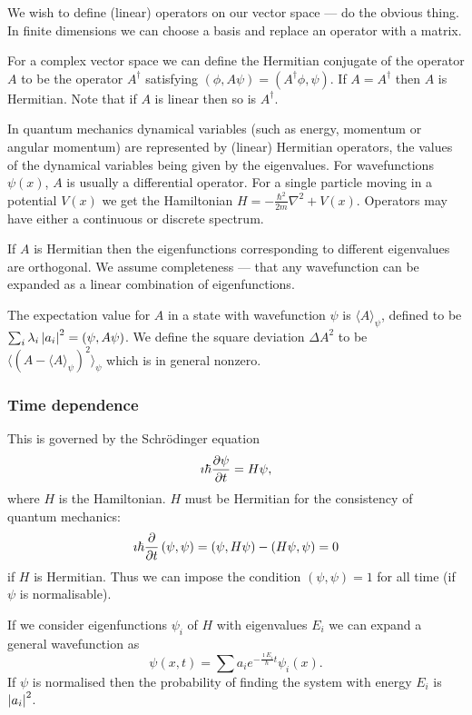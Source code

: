 \documentclass{notes}
\begin{document}
We wish to define (linear) operators on our vector space --- do the obvious
thing.  In finite dimensions we can choose a basis and replace an operator
with a matrix.

For a complex vector space we can define the Hermitian conjugate of the
operator $A$ to be the operator $A^\dag$ satisfying $(\phi, A \psi)
= (A^\dag \phi, \psi)$.  If $A = A^\dag$ then $A$ is Hermitian.  Note
that if $A$ is linear then so is $A^\dag$.

In quantum mechanics dynamical variables (such as energy, momentum
or angular momentum) are represented by (linear) Hermitian operators, the
values of the dynamical variables being given by the eigenvalues.  For
wavefunctions $\psi(x)$, $A$ is usually a differential operator.
For a single particle moving in a potential $V(x)$ we get the Hamiltonian
$H = -\frac{\hbar^2}{2 m} \nabla^2 + V(x)$.  Operators may have either
a continuous or discrete spectrum.

If $A$ is Hermitian then the eigenfunctions corresponding to different
eigenvalues are orthogonal.  We assume completeness --- that any wavefunction
can be expanded as a linear combination of eigenfunctions.

The expectation value for $A$ in a state with wavefunction $\psi$ is
$\langle A \rangle_\psi$, defined to be $\sum_i \lambda_i \left|a_i\right|^2
= \left( \psi, A \psi\right)$.  We define the square deviation $\Delta
A^2$ to be $\langle \left( A - \langle A \rangle_\psi \right)^2
\rangle_{\psi}$ which is in general nonzero.

\subsubsection{Time dependence}

This is governed by the Schr\"odinger equation
\[
\imath \hbar \frac{\partial \psi}{\partial t} = H \psi,
\]
where $H$ is the Hamiltonian.  $H$ must be Hermitian for the consistency
of quantum mechanics:
\[
\imath \hbar \frac{\partial }{\partial t} \left( \psi,\psi \right)
= \left( \psi,H\psi \right) - \left( H \psi, \psi\right) = 0
\]
if $H$ is Hermitian.  Thus we can impose the condition $\left( \psi, \psi
\right)=1$ for all time (if $\psi$ is normalisable).

If we consider eigenfunctions $\psi_i$ of $H$ with eigenvalues $E_i$ we
can expand a general wavefunction as
\[
\psi(x,t) = \sum a_i e^{-\frac{\imath E_i}{\hbar} t} \psi_i(x).
\]
If $\psi$ is normalised then the probability of finding the system with
energy $E_i$ is $\left|a_i\right|^2$.
\end{document}
